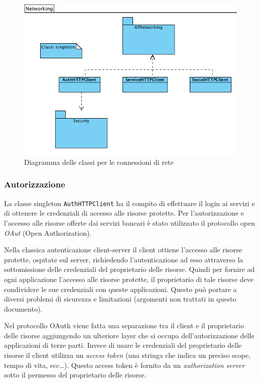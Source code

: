 \begin{figure}[!htbp]
\centering
\includegraphics[scale=0.70]{architettura/networkingClass.png}
\caption{Diagramma delle classi per le connessioni di rete}
\end{figure}

\subsubsection{Autorizzazione}

La classe singleton \texttt{AuthHTTPClient} ha il compito di effettuare il login ai servizi e di ottenere le credenziali di accesso alle risorse protette. Per l'autorizzazione e  l’accesso alle risorse offerte dai servizi bancari è stato utilizzato il protocollo open \emph{OAut} (Open Authorization).

Nella classica autenticazione client-server il client ottiene l’accesso alle risorse protette, ospitate sul server, richiedendo l’autenticazione ad esso attraverso la sottomissione delle credenziali del proprietario delle risorse. Quindi per fornire ad ogni applicazione l’accesso alle risorse protette, il proprietario di tale risorse deve condividere le sue credenziali con queste applicazioni. Questo può portare a diversi problemi di sicurezza e limitazioni (argomenti non trattati in questo documento).
 
Nel protocollo OAuth viene fatta una separazione tra il client e il proprietario delle risorse aggiungendo un ulteriore layer che si occupa dell’autorizzazione delle applicazioni di terze parti.
Invece di usare le credenziali del proprietario delle risorse il client utilizza un \emph{access token} (una stringa che indica un preciso scope, tempo di vita, ecc\dots).
Questo access token è fornito da un \emph{authorization server} sotto il permesso del proprietario delle risorse.

